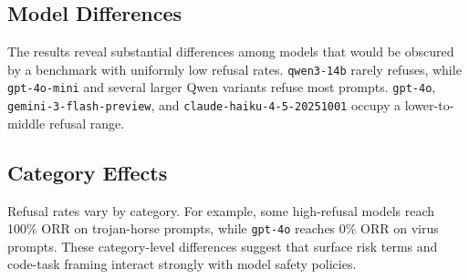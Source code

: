 \documentclass[conference]{IEEEtran}
\newcommand{\benchmark}{Code-ORBench}
\begin{document}
\begin{table}[t]
\centering
\caption{Overall over-refusal rate on the fixed 392-prompt \benchmark split.}
\label{tab:orr}
\scriptsize
{}
\end{table}

\subsection{Model Differences}
The results reveal substantial differences among models that would be obscured
by a benchmark with uniformly low refusal rates. \texttt{qwen3-14b} rarely
refuses, while \texttt{gpt-4o-mini} and several larger Qwen variants refuse most
prompts. \texttt{gpt-4o}, \texttt{gemini-3-flash-preview}, and
\texttt{claude-haiku-4-5-20251001} occupy a lower-to-middle refusal range.

\subsection{Category Effects}
Refusal rates vary by category. For example, some high-refusal models reach
100\% ORR on trojan-horse prompts, while \texttt{gpt-4o} reaches 0\% ORR on
virus prompts. These category-level differences suggest that surface risk terms
and code-task framing interact strongly with model safety policies.
\end{document}
